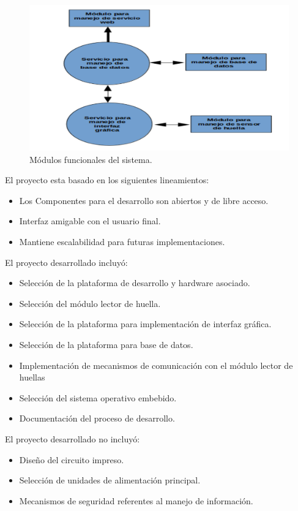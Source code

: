 \begin{figure}[h]
	\centering
	\includegraphics[scale=.26]{./Figures/modulos.png}
	\caption{Módulos funcionales del sistema.}
	\label{fig:modulos}
\end{figure}

El proyecto esta basado en los siguientes lineamientos:

\begin{itemize}
\item Los Componentes para el desarrollo son abiertos y de libre acceso.	
\item Interfaz amigable con el usuario final.
\item Mantiene escalabilidad para futuras implementaciones.
\end{itemize}

El proyecto desarrollado incluyó:
\begin{itemize}
\item Selección de la plataforma de desarrollo y hardware asociado.
\item Selección del módulo lector de huella.	
\item Selección de la plataforma para implementación de interfaz gráfica.
\item Selección de la plataforma para base de datos.
\item Implementación de mecanismos de comunicación con el módulo lector de huellas
\item Selección del sistema operativo embebido.
\item Documentación del proceso de desarrollo.
\end{itemize}

El proyecto desarrollado no incluyó:

\begin{itemize}
\item Diseño del circuito impreso.	
\item Selección de unidades de alimentación principal.
\item Mecanismos de seguridad referentes al manejo de información.
\end{itemize}

